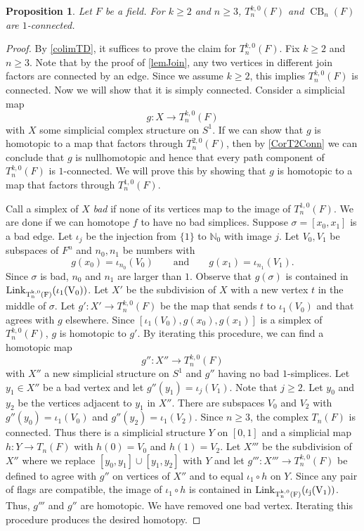 \documentclass[a4paper]{amsart}
\DeclareMathOperator{\CB}{CB}
\newcommand{\m}{\to}
\providecommand{\Link}{\ensuremath\mr{Link}}
\newcommand{\N}{\mathbb{N}_0}
\numberwithin{theoremcounter}{section}
\newtheorem{proposition}[propositionauto]{Proposition}
\theoremstyle{definition}
\theoremstyle{remark}
\newcommand{\mr}[1]{{\rm #1}}
\begin{document}
\begin{proposition} \label{badness} 
Let $F$ be a field. For $k \geq 2$ and $n \geq 3$, $T^{k,0}_n(F)$ and ${\CB}_n(F)$ are $1$-connected.  
\end{proposition}

\begin{proof}
By \autoref{colimTD}, it suffices to prove the claim for  $T^{k,0}_n(F)$.  Fix $k \geq 2$ and $n \geq 3$. Note that by the proof of  \autoref{lemJoin}, any two vertices in different join factors are connected by an edge. Since we assume $k \geq 2$, this implies $T^{k,0}_n(F)$ is connected. Now we will show that it is simply connected. Consider a simplicial map $$g \colon  X \m T^{k,0}_n(F)$$ with $X$ some simplicial complex structure on $S^1$. If we can show that $g$ is homotopic to a map that factors through $T^{2,0}_n(F)$, then by \autoref{CorT2Conn} we can conclude that $g$ is nullhomotopic and hence that every path component of $T^{k,0}_n(F)$ is $1$-connected. We will prove this  by showing that $g$ is homotopic to a map that factors through $T^{1,0}_n(F)$.

Call a simplex of $X$ \emph{bad} if  none of its vertices map to the image of $T^{1,0}_n(F)$. We are done if we can homotope $f$ to have no bad simplices. Suppose $\sigma=[x_0,x_1]$ is a bad edge. Let $\iota_j$ be the injection from $\{1\}$ to $\N$ with image $j$. Let $V_0, V_1$ be subspaces of $F^n$ and $n_0, n_1$ be numbers with $$g(x_0)=\iota_{n_0}(V_0) \qquad \text{and} \qquad g(x_1)=\iota_{n_1}(V_1) .$$ Since $\sigma$ is bad, $n_0$ and $n_1$ are larger than $1$. Observe that $g(\sigma)$ is contained in $\Link_{T^{k,0}_n(F)}(\iota_1(V_0))$. Let $X'$ be the subdivision of $X$ with a new vertex $t$ in the middle of $\sigma$. Let $g'\colon X' \m T^{k,0}_n(F)$ be the map that sends $t$ to $\iota_1(V_0)$ and that agrees with $g$ elsewhere. Since $[\iota_1(V_0),g(x_0),g(x_1)]$ is a simplex of $T^{k,0}_n(F)$, $g$ is homotopic to $g'$. By iterating this procedure, we can find a homotopic map $$g''\colon X'' \m T^{k,0}_n(F)$$ with $X''$ a new simplicial structure on $S^1$ and $g''$ having no bad $1$-simplices.  Let $y_1 \in X''$ be a bad vertex and let $g''(y_1)=\iota_j(V_1)$. Note that $j \geq 2$. Let $y_0$ and $y_2$ be the vertices adjacent to $y_1$ in $X''$. There are subspaces $V_0$ and $V_2$ with  $g''(y_0)=\iota_1(V_0)$ and $g''(y_2)=\iota_1(V_2)$. Since $n \geq 3$, the complex $T_n(F)$ is connected. Thus there is a simplicial structure $Y$ on $[0,1]$ and a simplicial map $h\colon Y \m T_n(F)$ with $h(0)=V_0$ and $h(1)=V_2$. Let $X'''$ be the subdivision of $X''$ where we replace $[y_0,y_1] \cup [y_1,y_2]$ with $Y$ and let $g'''\colon X''' \m T^{k,0}_n(F)$ be defined to agree with $g''$ on vertices of $X''$ and to equal $\iota_1 \circ h$ on $Y$. Since any pair of flags are compatible, the image of $\iota_1 \circ h$ is contained in $\Link_{T^{k,0}_n(F)} (\iota_j(V_1))$.  Thus, $g'''$ and $g''$ are homotopic. We have removed one bad vertex. Iterating this procedure produces the desired homotopy. \end{proof}
\end{document}
